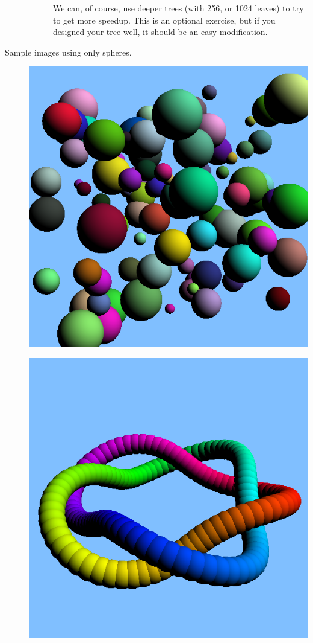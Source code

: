 \documentclass{article}
\begin{document}
\begin{description}
\begin{description}
  We can, of course, use deeper trees (with 256, or 1024 leaves) to
  try to get more speedup.  This is an optional exercise, but if you
  designed your tree well, it should be an easy modification.

\end{description}

  


\item[Sample images using only spheres.]\mbox{}

\begin{center}
      {\includegraphics[scale=0.5]{randomspheres.png}}

      {\includegraphics[scale=0.5]{ring01.png}}


\end{center}
\end{description}
\end{document}
